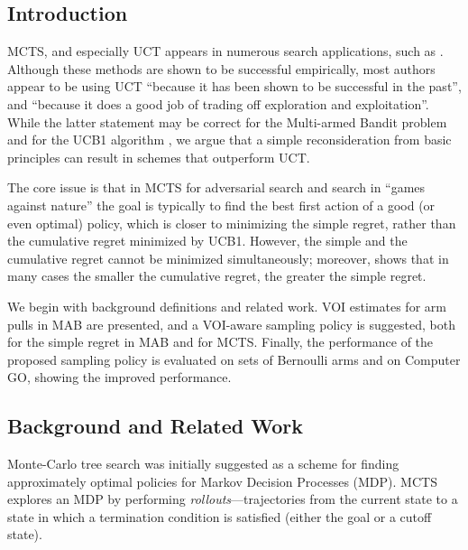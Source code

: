 \subsection{Introduction}

MCTS, and especially UCT \cite{Kocsis.uct} appears in numerous search
applications, such as \cite{Eyerich.ctp}. Although these methods are
shown to be successful empirically, most authors appear to be using
UCT ``because it has been shown to be successful in the past'', and
``because it does a good job of trading off exploration and
exploitation''. While the latter statement may be correct for the
Multi-armed Bandit problem and for the UCB1 algorithm \cite{Auer.ucb},
we argue that a simple reconsideration from basic principles can
result in schemes that outperform UCT.

The core issue is that in MCTS for adversarial search and search in
``games against nature'' the goal is typically to find the best
first action of a good (or even optimal) policy, which is closer to
minimizing the simple regret, rather than the cumulative regret
minimized by UCB1.  However, the simple and the cumulative regret
cannot be minimized simultaneously; moreover, \cite{Bubeck.pure} shows
that in many cases the smaller the cumulative regret, the greater the
simple regret.

We begin with background definitions and related work.  VOI estimates
for arm pulls in MAB are presented, and a VOI-aware sampling policy is
suggested, both for the simple regret in MAB and for MCTS.  Finally,
the performance of the proposed sampling policy is evaluated on sets
of Bernoulli arms and on Computer GO, showing the improved
performance.

\subsection{Background and Related Work}
\label{sec:related-work}

Monte-Carlo tree search was initially suggested as a scheme for
finding approximately optimal policies for Markov Decision Processes
(MDP).  MCTS explores an MDP by performing
\emph{rollouts}---trajectories from the current state to a state in
which a termination condition is satisfied (either the goal or a
cutoff state).

